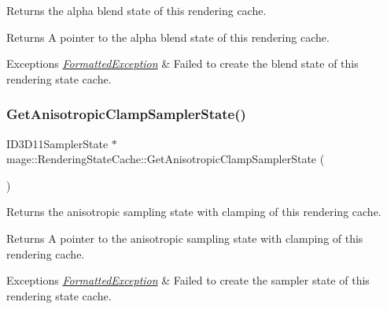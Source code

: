 Returns the alpha blend state of this rendering cache.

\begin{DoxyReturn}{Returns}
A pointer to the alpha blend state of this rendering cache. 
\end{DoxyReturn}

\begin{DoxyExceptions}{Exceptions}
{\em \hyperlink{structmage_1_1_formatted_exception}{Formatted\+Exception}} & Failed to create the blend state of this rendering state cache. \\
\hline
\end{DoxyExceptions}
\hypertarget{structmage_1_1_rendering_state_cache_ad4b0894beba4725e53a5a7ca3b9085cb}{}\label{structmage_1_1_rendering_state_cache_ad4b0894beba4725e53a5a7ca3b9085cb} 
\subsubsection{\texorpdfstring{Get\+Anisotropic\+Clamp\+Sampler\+State()}{GetAnisotropicClampSamplerState()}}
{\footnotesize\ttfamily I\+D3\+D11\+Sampler\+State $\ast$ mage\+::\+Rendering\+State\+Cache\+::\+Get\+Anisotropic\+Clamp\+Sampler\+State (\begin{DoxyParamCaption}{ }\end{DoxyParamCaption})}

Returns the anisotropic sampling state with clamping of this rendering cache.

\begin{DoxyReturn}{Returns}
A pointer to the anisotropic sampling state with clamping of this rendering cache. 
\end{DoxyReturn}

\begin{DoxyExceptions}{Exceptions}
{\em \hyperlink{structmage_1_1_formatted_exception}{Formatted\+Exception}} & Failed to create the sampler state of this rendering state cache. \\
\hline
\end{DoxyExceptions}
\hypertarget{structmage_1_1_rendering_state_cache_a183a1b919105bd1758cc6fb6cdeab018}{}\label{structmage_1_1_rendering_state_cache_a183a1b919105bd1758cc6fb6cdeab018} 
